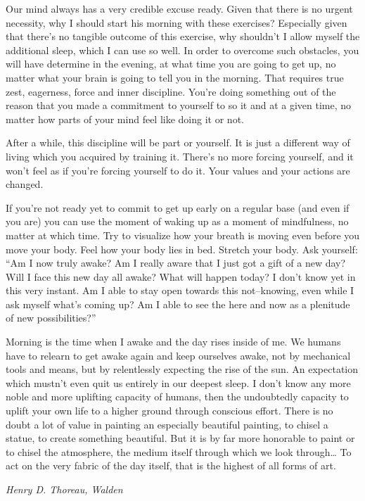 \documentclass[../main.tex]{subfiles}
\begin{document}
Our mind always has a very credible excuse ready. Given that there is no urgent necessity, why I should start his morning with these exercises?
Especially given that there's no tangible outcome of this exercise, why shouldn't I allow myself the additional sleep, which I can use so well.
In order to overcome such obstacles, you will have determine in the evening, at what time you are going to get up, no matter what your brain is going to tell you in the morning.
That requires true zest, eagerness, force and inner discipline. You're doing something out of the reason that you made a commitment to yourself to so it and at a given time, no matter how parts of your mind feel like doing it or not.

After a while, this discipline will be part or yourself.
It is just a different way of living which you acquired by training it.
There's no more forcing yourself, and it won't feel as if you're forcing yourself to do it.
Your values and your actions are changed.

If you're not ready yet to commit to get up early on a regular base (and even if you are) you can use the moment of waking up as a moment of mindfulness, no matter at which time.
Try to visualize how your breath is moving even before you move your body.
Feel how your body lies in bed.
Stretch your body.
Ask yourself: ``Am I now truly awake? Am I really aware that I just got a gift of a new day?
Will I face this new day all awake? What will happen today?
I don't know yet in this very instant.
Am I able to stay open towards this not--knowing, even while I ask myself what's coming up?
Am I able to see the here and now as a plenitude of new possibilities?''

\setlength{}

\epigraph{Morning is the time when I awake and the day rises inside of me.
  We humans have to relearn to get awake again and keep ourselves awake, not by mechanical tools and means,
  but by relentlessly expecting the rise of the sun. An expectation which mustn't even quit us entirely in our deepest sleep.
  I don't know any more noble and more uplifting capacity of humans, then the undoubtedly capacity to uplift your own life to a higher ground through conscious effort.
  There is no doubt a lot of value in painting an especially beautiful painting, to chisel a statue, to create something beautiful.
  But it is by far more honorable to paint or to chisel the atmosphere, the medium itself through which we look through\ldots
  To act on the very fabric of the day itself, that is the highest of all forms of art.
}{\textit{Henry D. Thoreau, Walden}}
\setlength{}
\end{document}
